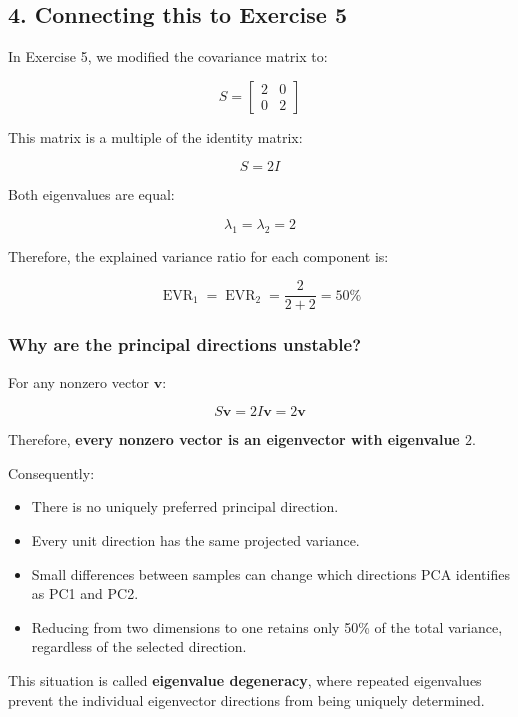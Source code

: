 \documentclass[11pt]{article}
\providecommand{\tightlist}{%
      \setlength{\itemsep}{0pt}\setlength{\parskip}{0pt}}
\begin{document}
\subsection{4. Connecting this to Exercise
5}\label{connecting-this-to-exercise-5}

In Exercise 5, we modified the covariance matrix to:

\[
S =
\begin{bmatrix}
2 & 0 \\
0 & 2
\end{bmatrix}
\]

This matrix is a multiple of the identity matrix:

\[
S = 2I
\]

Both eigenvalues are equal:

\[
\lambda_1 = \lambda_2 = 2
\]

Therefore, the explained variance ratio for each component is:

\[
\operatorname{EVR}_1 =
\operatorname{EVR}_2 =
\frac{2}{2+2}
= 50\%
\]

\subsubsection{Why are the principal directions
unstable?}\label{why-are-the-principal-directions-unstable}

For any nonzero vector \(\mathbf{v}\):

\[
S\mathbf{v} = 2I\mathbf{v} = 2\mathbf{v}
\]

Therefore, \textbf{every nonzero vector is an eigenvector with
eigenvalue \(2\)}.

Consequently:

\begin{itemize}
\tightlist
\item
  There is no uniquely preferred principal direction.
\item
  Every unit direction has the same projected variance.
\item
  Small differences between samples can change which directions PCA
  identifies as PC1 and PC2.
\item
  Reducing from two dimensions to one retains only 50\% of the total
  variance, regardless of the selected direction.
\end{itemize}

This situation is called \textbf{eigenvalue degeneracy}, where repeated
eigenvalues prevent the individual eigenvector directions from being
uniquely determined.
\end{document}
